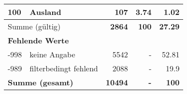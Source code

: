 \begin{longtable}{lXrrr}
     100 &
     \multicolumn{1}{X}{ Ausland   } &


       \num{107} &
       \num[round-mode=places,round-precision=2]{3,74} &
         \num[round-mode=places,round-precision=2]{1,02} \\
     \midrule
     \multicolumn{2}{l}{Summe (gültig)} &
       \textbf{\num{2864}} &
     \textbf{100} &
       \textbf{\num[round-mode=places,round-precision=2]{27,29}} \\
     \multicolumn{5}{l}{\textbf{Fehlende Werte}}\\
       -998 &
       keine Angabe &
         \num{5542} &
        - &
         \num[round-mode=places,round-precision=2]{52,81} \\
       -989 &
       filterbedingt fehlend &
         \num{2088} &
        - &
         \num[round-mode=places,round-precision=2]{19,9} \\
     \midrule
     \multicolumn{2}{l}{\textbf{Summe (gesamt)}} &
          \textbf{\num{10494}} &
        \textbf{-} &
        \textbf{100} \\
     \bottomrule
     \end{longtable}
     

